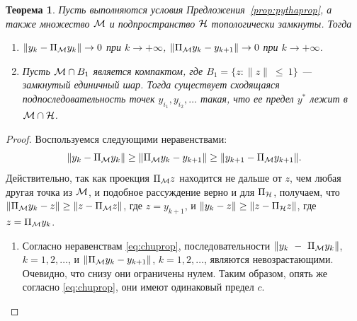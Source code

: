 \documentclass[12pt, specialist, subf,href,colorlinks=true,substylefile = spbu.rtx]{disser}
\newtheorem{theorem}{Теорема}
\theoremstyle{remark}
\theoremstyle{definition}
\begin{document}
\begin{theorem}
	\label{th:converg}
		Пусть выполняются условия Предложения~\ref{prop:pythaprop}, а также множество $\mathcal{M}$ и подпространство $\mathcal{H}$ топологически замкнуты. Тогда
	\begin{enumerate}
		\item $\|y_k - \Pi_{\mathcal{M}}y_k\| \to 0$ при $k \to +\infty$, $\|\Pi_{\mathcal{M}}y_k - y_{k+1}\| \to 0$ при $k \to +\infty$.
		\item Пусть $\mathcal{M} \cap B_1$ является компактом, где $B_1=\{z: \|z\|~\le~1\}$ --- замкнутый единичный шар. Тогда существует сходящаяся подпоследовательность точек $y_{i_1}, y_{i_2}, \ldots$ такая, что ее предел $y^*$ лежит в $\mathcal{M} \cap \mathcal{H}$.
	\end{enumerate}
\end{theorem}
\begin{proof}
	Воспользуемся следующими неравенствами:
	\begin{equation}
	\label{eq:chuprop}
	\|y_k - \Pi_{\mathcal{M}} y_k\| \ge \|\Pi_{\mathcal{M}} y_k - y_{k + 1}\| \ge \|y_{k+1} - \Pi_{\mathcal{M}} y_{k + 1}\|.
	\end{equation}
	Действительно, так как проекция $\Pi_{\mathcal{M}} z$ находится не дальше от $z$, чем любая другая точка из $\mathcal{M}$, и подобное рассуждение верно и для
	$\Pi_{\mathcal{H}}$, получаем, что $\|\Pi_{\mathcal{M}} y_k - z\| \ge \|z - \Pi_{\mathcal{M}} z\|$, где $z=y_{k+1}$, и $\|y_k - z\| \ge \|z - \Pi_{\mathcal{H}} z\|$, где $z=\Pi_{\mathcal{M}} y_k$.
	\begin{enumerate}
		\item Согласно неравенствам \eqref{eq:chuprop}, последовательности $\|y_k~-~\Pi_{\mathcal{M}} y_k\|$, $k = 1, 2, \ldots$, и $\|\Pi_{\mathcal{M}} y_k - y_{k + 1}\|$, $k = 1, 2, \ldots$, являются невозрастающими. Очевидно, что снизу они ограничены нулем. Таким образом, опять же согласно \eqref{eq:chuprop}, они имеют одинаковый предел $c$.
		

\end{enumerate}
\end{proof}
\end{document}
